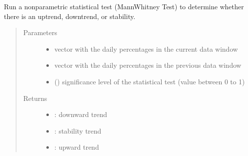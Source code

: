 \documentclass[letterpaper,10pt,english]{sphinxmanual}
\begin{document}
\begin{fulllineitems}
\label{\detokenize{algorithms:algorithms.eti.eti_utils.test_non_parametric}}
\sphinxAtStartPar
Run a non\sphinxhyphen{}parametric statistical test (Mann\sphinxhyphen{}Whitney Test) to determine whether there is an uptrend, downtrend, or
stability.
\begin{quote}\begin{description}
\item[{Parameters}] \leavevmode\begin{itemize}
\item {} 
\sphinxAtStartPar
{} \textendash{} vector with the daily percentages in the current data window

\item {} 
\sphinxAtStartPar
{} \textendash{} vector with the daily percentages in the previous data window

\item {} 
\sphinxAtStartPar
{} () \textendash{} significance level of the statistical test (value between 0 to 1)

\end{itemize}

\item[{Returns}] \leavevmode
\sphinxAtStartPar
\begin{itemize}
\item {} 
: downward trend

\item {} 
: stability trend

\item {} 
: upward trend

\end{itemize}


\end{description}\end{quote}

\end{fulllineitems}
\end{document}
